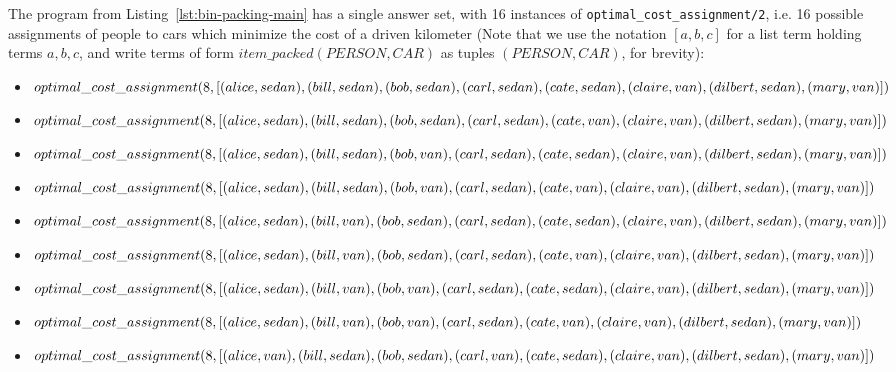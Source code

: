 The program from Listing~\ref{lst:bin-packing-main} has a single answer set, with 16 instances of \texttt{optimal\_cost\_assignment/2}, i.e. 16 possible assignments of people to cars which minimize the cost of a driven kilometer (Note that we use the notation $[a, b, c]$ for a list term holding terms $a, b, c$, and write terms of form $item\_packed(PERSON, CAR)$ as tuples $(PERSON, CAR)$, for brevity):
\begin{itemize}
	\item $optimal\_cost\_assignment(8, [(alice, sedan), (bill, sedan), (bob, sedan), (carl, sedan),\\(cate, sedan), (claire, van), (dilbert, sedan), (mary, van)])$
	\item $optimal\_cost\_assignment(8, [(alice, sedan), (bill, sedan), (bob, sedan), (carl, sedan),\\(cate, van), (claire, van), (dilbert, sedan), (mary, van)])$
	\item $optimal\_cost\_assignment(8, [(alice, sedan), (bill, sedan), (bob, van), (carl, sedan),\\(cate, sedan), (claire, van), (dilbert, sedan), (mary, van)])$
	\item $optimal\_cost\_assignment(8, [(alice, sedan), (bill, sedan), (bob, van), (carl, sedan),\\(cate, van), (claire, van), (dilbert, sedan), (mary, van)])$
	\item $optimal\_cost\_assignment(8, [(alice, sedan), (bill, van), (bob, sedan), (carl, sedan),\\(cate, sedan), (claire, van), (dilbert, sedan), (mary, van)])$
	\item $optimal\_cost\_assignment(8, [(alice, sedan), (bill, van), (bob, sedan), (carl, sedan),\\(cate, van), (claire, van), (dilbert, sedan), (mary, van)])$
	\item $optimal\_cost\_assignment(8, [(alice, sedan), (bill, van), (bob, van), (carl, sedan),\\(cate, sedan), (claire, van), (dilbert, sedan), (mary, van)])$
	\item $optimal\_cost\_assignment(8, [(alice, sedan), (bill, van), (bob, van), (carl, sedan),\\(cate, van), (claire, van), (dilbert, sedan), (mary, van)])$
	\item $optimal\_cost\_assignment(8, [(alice, van), (bill, sedan), (bob, sedan), (carl, van),\\(cate, sedan), (claire, van), (dilbert, sedan), (mary, van)])$

\end{itemize}
